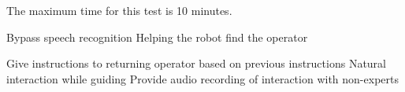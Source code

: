 
The maximum time for this test is 10 minutes.

\begin{scorelist}

	 {Bypass speech recognition}
	 {Helping the robot find the operator}
	
	 {Give instructions to returning operator based on previous instructions}
	 {Natural interaction while guiding}
	 {Provide audio recording of interaction with non-experts}
\end{scorelist}

